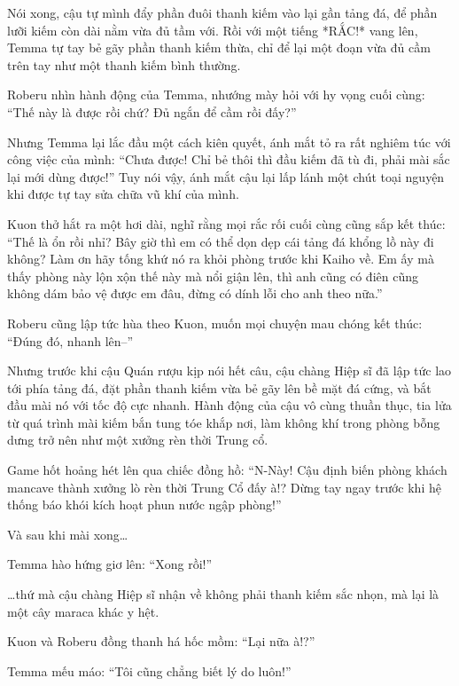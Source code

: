 \documentclass[../main.tex]{subfiles}
\begin{document}
Nói xong, cậu tự mình đẩy phần đuôi thanh kiếm vào lại gần tảng đá, để phần lưỡi kiếm còn dài nằm vừa đủ tầm với. Rồi với một tiếng *RẮC!* vang lên, Temma tự tay bẻ gãy phần thanh kiếm thừa, chỉ để lại một đoạn vừa đủ cầm trên tay như một thanh kiếm bình thường.


Roberu nhìn hành động của Temma, nhướng mày hỏi với hy vọng cuối cùng: ``Thế này là được rồi chứ? Đủ ngắn để cầm rồi đấy?''

Nhưng Temma lại lắc đầu một cách kiên quyết, ánh mắt tỏ ra rất nghiêm túc với công việc của mình: ``Chưa được! Chỉ bẻ thôi thì đầu kiếm đã tù đi, phải mài sắc lại mới dùng được!'' Tuy nói vậy, ánh mắt cậu lại lấp lánh một chút toại nguyện khi được tự tay sửa chữa vũ khí của mình.

Kuon thở hắt ra một hơi dài, nghĩ rằng mọi rắc rối cuối cùng cũng sắp kết thúc: ``Thế là ổn rồi nhỉ? Bây giờ thì em có thể dọn dẹp cái tảng đá khổng lồ này đi không? Làm ơn hãy tống khứ nó ra khỏi phòng trước khi Kaiho về. Em ấy mà thấy phòng này lộn xộn thế này mà nổi giận lên, thì anh cũng có điên cũng không dám bảo vệ được em đâu, đừng có dính lỗi cho anh theo nữa.''

Roberu cũng lập tức hùa theo Kuon, muốn mọi chuyện mau chóng kết thúc: ``Đúng đó, nhanh lên--''

Nhưng trước khi cậu Quán rượu kịp nói hết câu, cậu chàng Hiệp sĩ đã lập tức lao tới phía tảng đá, đặt phần thanh kiếm vừa bẻ gãy lên bề mặt đá cứng, và bắt đầu mài nó với tốc độ cực nhanh. Hành động của cậu vô cùng thuần thục, tia lửa từ quá trình mài kiếm bắn tung tóe khắp nơi, làm không khí trong phòng bỗng dưng trở nên như một xưởng rèn thời Trung cổ.


Game hốt hoảng hét lên qua chiếc đồng hồ: ``N-Này! Cậu định biến phòng khách mancave thành xưởng lò rèn thời Trung Cổ đấy à!? Dừng tay ngay trước khi hệ thống báo khói kích hoạt phun nước ngập phòng!''

Và sau khi mài xong\dots

Temma hào hứng giơ lên: ``Xong rồi!''

\dots thứ mà cậu chàng Hiệp sĩ nhận về không phải thanh kiếm sắc nhọn, mà lại là một cây maraca khác y hệt.


Kuon và Roberu đồng thanh há hốc mồm: ``Lại nữa à!?''

Temma mếu máo: ``Tôi cũng chẳng biết lý do luôn!''
\end{document}
